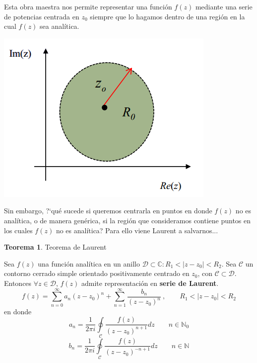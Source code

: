\documentclass[12pt]{article}
\theoremstyle{definition}
\theoremstyle{theorem}
\newtheorem{theorem}{Teorema}[section]
\theoremstyle{corolary}
\theoremstyle{method}
\begin{document}
Esta obra maestra nos permite representar una funci\'on $f(z)$ mediante una serie de potencias centrada en $z_0$ siempre que lo hagamos dentro de una regi\'on en la cual $f(z)$ sea anal\'itica.

\begin{center}
	\includegraphics[scale=0.8]{taylor_reg.png}
\end{center}

Sin embargo, ?`qu\'e sucede si queremos centrarla en puntos en donde $f(z)$ no es anal\'itica, o de manera gen\'erica, si la regi\'on que consideramos contiene puntos en los cuales $f(z)$ no es anal\'itica? Para ello viene Laurent a salvarnos...\\

\colorbox{blue!40!white!80}{\parbox{\linewidth}{
\theoremstyle{theorem}
\begin{theorem} {Teorema de Laurent}

Sea $f(z)$ una funci\'on anal\'itica en un anillo $\mathcal{D} \subset \mathbb{C}: R_1<|z-z_0|<R_2$. Sea $\mathcal{C}$ un contorno cerrado simple orientado positivamente centrado en $z_0$, con $\mathcal{C}\subset \mathcal{D}$.\\
Entonces $\forall z\in \mathcal{D}$, $f(z)$ admite representaci\'on en \textbf{serie de Laurent}.
$$f(z)=\sum\limits_{n=0}^{\infty}a_n(z-z_0)^n+\sum\limits_{n=1}^{\infty}\frac{b_n}{(z-z_0)^n}\ ,\qquad R_1<|z-z_0|<R_2$$
en donde $$a_n=\frac{1}{2\pi i} \oint\limits_{\mathcal{C}}\frac{f(z)}{(z-z_0)^{n+1}} dz \qquad n\in \mathbb{N}_0$$
$$b_n=\frac{1}{2\pi i} \oint\limits_{\mathcal{C}}\frac{f(z)}{(z-z_0)^{-n+1}} dz \qquad n\in \mathbb{N}$$

\end{theorem}}}
\linebreak
\linebreak
\end{document}
